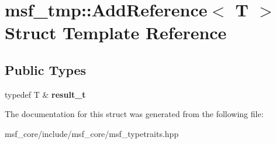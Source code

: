 \hypertarget{structmsf__tmp_1_1AddReference}{\section{msf\-\_\-tmp\-:\-:Add\-Reference$<$ T $>$ Struct Template Reference}
\label{structmsf__tmp_1_1AddReference}
}
\subsection*{Public Types}
\begin{DoxyCompactItemize}
\item 
\hypertarget{structmsf__tmp_1_1AddReference_a85b751fb4f4b21b74497dbf84d29092a}{typedef T \& {\bfseries result\-\_\-t}}\label{structmsf__tmp_1_1AddReference_a85b751fb4f4b21b74497dbf84d29092a}

\end{DoxyCompactItemize}


The documentation for this struct was generated from the following file\-:\begin{DoxyCompactItemize}
\item 
msf\-\_\-core/include/msf\-\_\-core/msf\-\_\-typetraits.\-hpp\end{DoxyCompactItemize}
